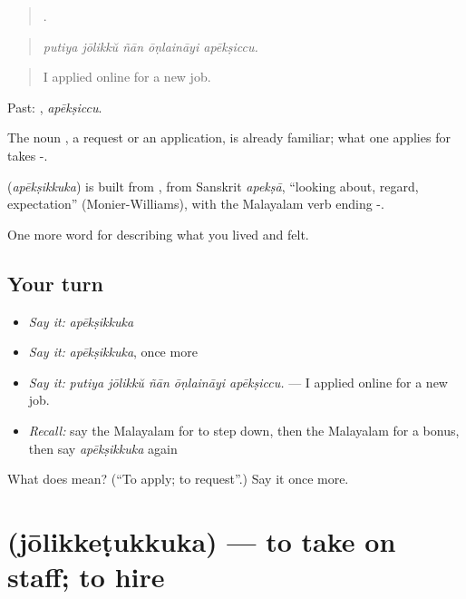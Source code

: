\begin{quote}
    .
\end{quote}

\begin{quote}
\emph{putiya jōlikkŭ ñān ōṇlaināyi apēkṣiccu.}
\end{quote}

\begin{quote}
I applied online for a new job.
\end{quote}

Past: , \emph{apēkṣiccu}.

The noun , a request or an application, is already familiar; what one applies for takes -.

\begin{cousinweb}
\textbf{} (\emph{apēkṣikkuka}) is built from , from Sanskrit \emph{apekṣā}, \textquotedblleft{}looking about, regard, expectation\textquotedblright{} (Monier-Williams), with the Malayalam verb ending -.
\end{cousinweb}

\begin{grammarlens}[title={What you've built}]
One more word for describing what you lived and felt.
\end{grammarlens}

\subsection*{Your turn}
\begin{itemize}
\raggedright
  \item \emph{Say it:} \emph{apēkṣikkuka}
  \item \emph{Say it:} \emph{apēkṣikkuka}, once more
  \item \emph{Say it:} \emph{putiya jōlikkŭ ñān ōṇlaināyi apēkṣiccu.} — I applied online for a new job.
  \item \emph{Recall:} say the Malayalam for to step down, then the Malayalam for a bonus, then say \emph{apēkṣikkuka} again
\end{itemize}

\begin{tcolorbox}[breakable,colback=teal!4,colframe=teal!35!black,title={Before you move on}]
What does  mean? (\textquotedblleft{}To apply; to request\textquotedblright{}.) Say it once more.
\end{tcolorbox}
\section[\texorpdfstring{\ml{ജോലിക്കെടുക്കുക} (jōlikkeṭukkuka)}{ജോലിക്കെടുക്കുക (jōlikkeṭukkuka)}]{ (jōlikkeṭukkuka) — to take on staff; to hire}

